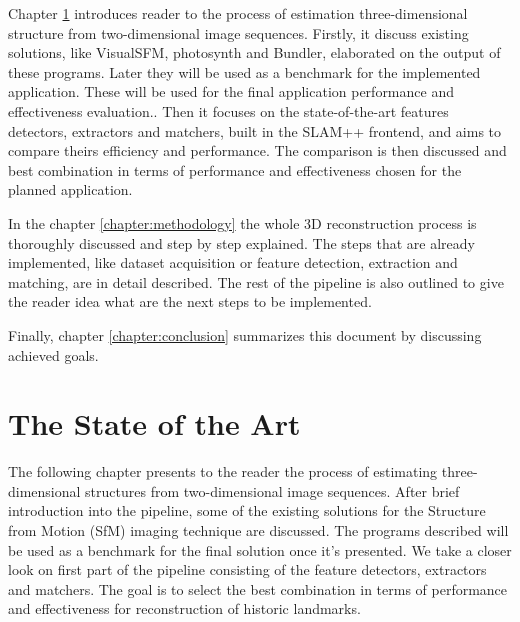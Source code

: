 Chapter \ref{chapter:the-state-of-the-art} introduces reader to the process of estimation three-dimensional structure from two-dimensional image sequences. Firstly, it discuss existing solutions, like VisualSFM, photosynth and Bundler, elaborated on the output of these programs. Later they will be used as a benchmark for the implemented application. These will be used for the final application performance and effectiveness evaluation.. Then it focuses on the state-of-the-art features detectors, extractors and matchers, built in the SLAM++ frontend, and aims to compare theirs efficiency and performance. The comparison is then discussed and best combination in terms of performance and effectiveness chosen for the planned application.

In the chapter \ref{chapter:methodology} the whole 3D reconstruction process is thoroughly discussed and step by step explained. The steps that are already implemented, like dataset acquisition or feature detection, extraction and matching, are in detail described. The rest of the pipeline is also outlined to give the reader idea what are the next steps to be implemented. 

Finally, chapter \ref{chapter:conclusion} summarizes this document by discussing achieved goals.

\chapter{The State of the Art}
\label{chapter:the-state-of-the-art}
The following chapter presents to the reader the process of estimating three-dimensional structures from two-dimensional image sequences. After brief introduction into the pipeline, some of the existing solutions for the Structure from Motion (SfM) imaging technique are discussed. The programs described will be used as a benchmark for the final solution once it's presented. We take a closer look on first part of the pipeline consisting of the feature detectors, extractors and matchers. The goal is to select the best combination in terms of performance and effectiveness for reconstruction of historic landmarks. 

